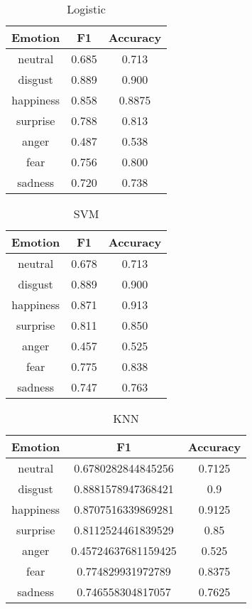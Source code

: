 \begin{table}[t]
\caption{Logistic}
\label{table:logistic}
\centering
\begin{tabular}{|c|c|c|}
\hline
\textbf{Emotion} &  \textbf{F1} &  \textbf{Accuracy} \\ \hline \hline
neutral & 0.685 & 0.713 \\ \hline
disgust & 0.889 & 0.900 \\ \hline
happiness & 0.858 & 0.8875 \\ \hline
surprise & 0.788 & 0.813 \\ \hline
anger & 0.487 & 0.538 \\ \hline
fear & 0.756 & 0.800 \\ \hline
sadness & 0.720 & 0.738 \\ \hline
\end{tabular}
\end{table}

\begin{table}[t]
\caption{SVM}
\label{table:svm}
\centering
\begin{tabular}{|c|c|c|}
\hline
\textbf{Emotion} &  \textbf{F1} &  \textbf{Accuracy} \\ \hline \hline
neutral& 0.678 & 0.713  \\ \hline
disgust& 0.889 & 0.900 \\ \hline
happiness& 0.871 & 0.913 \\ \hline
surprise& 0.811& 0.850 \\ \hline
anger& 0.457& 0.525 \\ \hline
fear& 0.775 & 0.838 \\ \hline
sadness& 0.747 & 0.763 \\ \hline
\end{tabular}
\end{table}

\begin{table}[t]
\caption{KNN}
\label{table:knn}
\centering
\begin{tabular}{|c|c|c|}
\hline
\textbf{Emotion} &  \textbf{F1} &  \textbf{Accuracy} \\ \hline \hline
neutral& 0.6780282844845256& 0.7125 \\ \hline
disgust& 0.8881578947368421& 0.9 \\ \hline
happiness& 0.8707516339869281& 0.9125 \\ \hline
surprise& 0.8112524461839529& 0.85 \\ \hline
anger& 0.45724637681159425& 0.525 \\ \hline
fear& 0.774829931972789& 0.8375 \\ \hline
sadness& 0.746558304817057& 0.7625 \\ \hline
\end{tabular}
\end{table}
